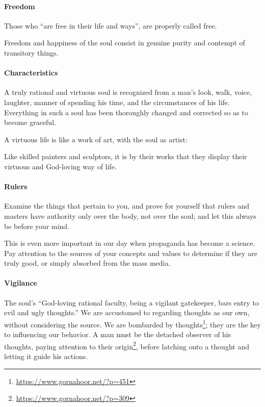 \paragraph{Freedom}
Those who “are free in their life and ways”, are properly called free. 

\begin{quotex}
Freedom and happiness of the soul consist in genuine purity and contempt of transitory things.

\end{quotex}
\paragraph{Characteristics}
\begin{quotex}
A truly rational and virtuous soul is recognized from a man's look, walk, voice, laughter, manner of
spending his time, and the circumstances of his life. Everything in such a soul has been thoroughly changed and
corrected so as to become graceful. 

\end{quotex}
A virtuous life is like a work of art, with the soul as artist: 

\begin{quotex}
Like skilled painters and sculptors, it is by their works that they display their virtuous and God-loving way of life.

\end{quotex}
\paragraph{Rulers}
\begin{quotex}
Examine the things that pertain to you, and prove for yourself that rulers and masters have authority only over the
body, not over the soul; and let this always be before your mind. 

\end{quotex}
This is even more important in our day when propaganda has become a science. Pay attention to the sources of your
concepts and values to determine if they are truly good, or simply absorbed from the mass media.

\paragraph{Vigilance}
The soul's “God-loving rational faculty, being a vigilant gatekeeper, bars entry to evil and ugly thoughts.”
We are accustomed to regarding thoughts as our own, without considering the source. We are bombarded by thoughts\footnote{\url{https://www.gornahoor.net/?p=451}}; they
are the key to influencing our behavior. A man must be the detached observer of his thoughts, paying attention to their
origin\footnote{\url{https://www.gornahoor.net/?p=309}}, before latching onto a thought and letting it guide his actions.

